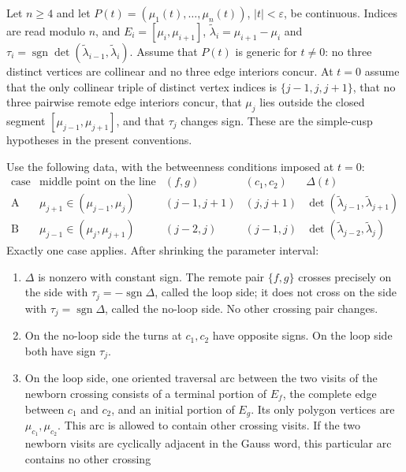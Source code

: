 \begin{lemma}\label{lem:cusp-sides}
Let $n\geq4$ and let
$P(t)=(\mu_1(t),\ldots,\mu_n(t))$, $|t|<\varepsilon$, be continuous.
Indices are read modulo $n$, and
$E_i=[\mu_i,\mu_{i+1}]$,
$\widetilde\lambda_i=\mu_{i+1}-\mu_i$ and
$\tau_i=\operatorname{sgn}\det(\widetilde\lambda_{i-1},\widetilde\lambda_i)$.
Assume that $P(t)$ is generic for $t\ne0$: no three distinct vertices are
collinear and no three edge interiors concur. At $t=0$ assume that the only
collinear triple of distinct vertex indices is $\{j-1,j,j+1\}$, that no
three pairwise remote edge interiors concur, that $\mu_j$ lies outside the
closed segment $[\mu_{j-1},\mu_{j+1}]$, and that $\tau_j$ changes sign.
These are the simple-cusp hypotheses in the present conventions.

Use the following data, with the betweenness conditions imposed at $t=0$:
\begin{equation}\label{cusppr:data}
\begin{array}{c|c|c|c|c}
\text{case}&\text{middle point on the line}&(f,g)&(c_1,c_2)&\Delta(t)\\ \hline
\mathrm A&\mu_{j+1}\in(\mu_{j-1},\mu_j)&(j-1,j+1)&(j,j+1)&
 \det(\widetilde\lambda_{j-1},\widetilde\lambda_{j+1})\\
\mathrm B&\mu_{j-1}\in(\mu_j,\mu_{j+1})&(j-2,j)&(j-1,j)&
 \det(\widetilde\lambda_{j-2},\widetilde\lambda_j)
\end{array}
\end{equation}
Exactly one case applies. After shrinking the parameter interval:
\begin{enumerate}
\item[(i)] $\Delta$ is nonzero with constant sign. The remote pair
$\{f,g\}$ crosses precisely on the side with
$\tau_j=-\operatorname{sgn}\Delta$, called the loop side; it does not cross
on the side with $\tau_j=\operatorname{sgn}\Delta$, called the no-loop side.
No other crossing pair changes.
\item[(ii)] On the no-loop side the turns at $c_1,c_2$ have opposite signs.
On the loop side both have sign $\tau_j$.
\item[(iii)] On the loop side, one oriented traversal arc between the two
visits of the newborn crossing consists of a terminal portion of $E_f$,
the complete edge between $c_1$ and $c_2$, and an initial portion of $E_g$.
Its only polygon vertices are $\mu_{c_1},\mu_{c_2}$. This arc is allowed to
contain other crossing visits. If the two newborn visits are cyclically
adjacent in the Gauss word, this particular arc contains no other crossing

\end{enumerate}
\end{lemma}
